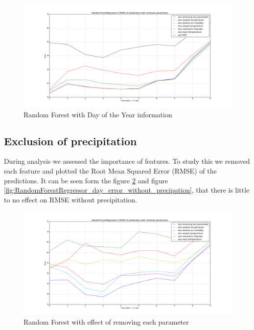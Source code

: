 \documentclass{scrartcl}
\begin{document}
\begin{figure}[H]
  \center
  \includegraphics[width=1\linewidth]{img/RandomForestRegressor_day_error_without_some_params_DOY.png}
  \caption{Random Forest with Day of the Year information}
  \label{fig:RandomForestRegressor_day_error_without_some_params_DOY}
\end{figure}


\subsection{Exclusion of precipitation}	
During analysis we assessed the importance of features. To study this we removed each feature and plotted the Root Mean Squared Error (RMSE) of the predictions. It can be seen form the figure \ref{fig:RandomForestRegressor_day_error_without_some_params} and figure \ref{fig:RandomForestRegressor_day_error_without_precipation}, that there is little to no effect on RMSE without precipitation.


\begin{figure}[H]
  \center
  \includegraphics[width=1\linewidth]{img/RandomForestRegressor_day_error_without_some_params.png}
  \caption{Random Forest with effect of removing each parameter}
  \label{fig:RandomForestRegressor_day_error_without_some_params}
\end{figure}
\end{document}
